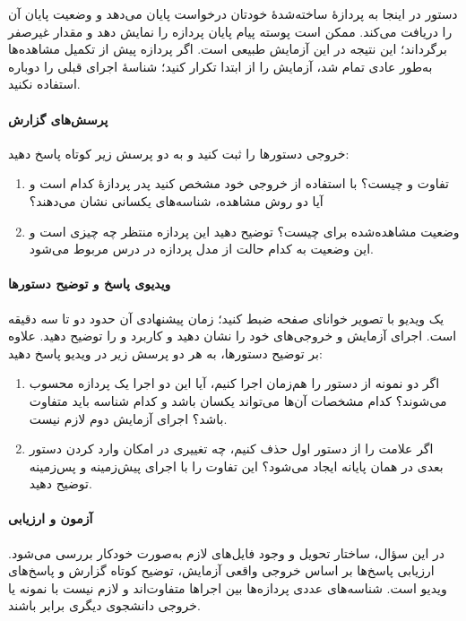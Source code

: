 دستور  در اینجا به پردازهٔ ساخته‌شدهٔ خودتان درخواست
پایان می‌دهد و  وضعیت پایان آن را دریافت می‌کند.
ممکن است پوسته پیام پایان پردازه را نمایش دهد و
 مقدار غیرصفر برگرداند؛ این نتیجه در این آزمایش طبیعی است.
اگر پردازه پیش از تکمیل مشاهده‌ها به‌طور عادی تمام شد، آزمایش را از
ابتدا تکرار کنید؛ شناسهٔ اجرای قبلی را دوباره استفاده نکنید.

\paragraph{پرسش‌های گزارش}
خروجی دستورها را ثبت کنید و به دو پرسش زیر کوتاه پاسخ دهید:

\begin{enumerate}
  \item تفاوت  و  چیست؟ با استفاده
  از خروجی خود مشخص کنید پدر پردازهٔ  کدام است و
  آیا دو روش مشاهده، شناسه‌های یکسانی نشان می‌دهند؟
  \item وضعیت مشاهده‌شده برای  چیست؟ توضیح دهید
  این پردازه منتظر چه چیزی است و این وضعیت به کدام حالت از مدل
  پردازه در درس مربوط می‌شود.
\end{enumerate}

\paragraph{ویدیوی پاسخ و توضیح دستورها}
یک ویدیو با تصویر خوانای صفحه ضبط کنید؛ زمان پیشنهادی آن حدود دو تا
سه دقیقه است. اجرای آزمایش و خروجی‌های خود را نشان دهید و کاربرد
\lr{\texttt{\$\$}} و \lr{\texttt{\$!}} را توضیح دهید.
علاوه بر توضیح دستورها، به هر دو پرسش زیر در ویدیو پاسخ دهید:

\begin{enumerate}
  \item اگر دو نمونه از دستور  را هم‌زمان اجرا
  کنیم، آیا این دو اجرا یک پردازه محسوب می‌شوند؟ کدام مشخصات آن‌ها می‌تواند
  یکسان باشد و کدام شناسه باید متفاوت باشد؟ اجرای آزمایش دوم لازم نیست.
  \item اگر علامت \lr{\texttt{\&}} را از دستور اول حذف کنیم، چه
  تغییری در امکان وارد کردن دستور بعدی در همان پایانه ایجاد می‌شود؟
  این تفاوت را با اجرای پیش‌زمینه و پس‌زمینه توضیح دهید.
\end{enumerate}

\paragraph{آزمون و ارزیابی}
در این سؤال، ساختار تحویل و وجود فایل‌های لازم به‌صورت خودکار بررسی
می‌شود. ارزیابی پاسخ‌ها بر اساس خروجی واقعی آزمایش، توضیح کوتاه گزارش
و پاسخ‌های ویدیو است. شناسه‌های عددی پردازه‌ها بین اجراها متفاوت‌اند
و لازم نیست با نمونه یا خروجی دانشجوی دیگری برابر باشند.

